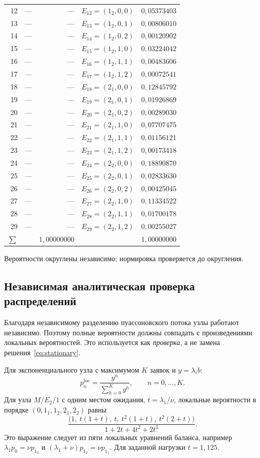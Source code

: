 \documentclass[a4paper,12pt]{article}
\begin{document}
{\begin{longtable}{@{}r l r l r@{}}
12 & --- & --- & $E_{12}=(1_{2},0,0)$ & $0{,}05373403$ \\
13 & --- & --- & $E_{13}=(1_{2},0,1)$ & $0{,}00806010$ \\
14 & --- & --- & $E_{14}=(1_{2},0,2)$ & $0{,}00120902$ \\
15 & --- & --- & $E_{15}=(1_{2},1,0)$ & $0{,}03224042$ \\
16 & --- & --- & $E_{16}=(1_{2},1,1)$ & $0{,}00483606$ \\
17 & --- & --- & $E_{17}=(1_{2},1,2)$ & $0{,}00072541$ \\
18 & --- & --- & $E_{18}=(2_{1},0,0)$ & $0{,}12845792$ \\
19 & --- & --- & $E_{19}=(2_{1},0,1)$ & $0{,}01926869$ \\
20 & --- & --- & $E_{20}=(2_{1},0,2)$ & $0{,}00289030$ \\
21 & --- & --- & $E_{21}=(2_{1},1,0)$ & $0{,}07707475$ \\
22 & --- & --- & $E_{22}=(2_{1},1,1)$ & $0{,}01156121$ \\
23 & --- & --- & $E_{23}=(2_{1},1,2)$ & $0{,}00173418$ \\
24 & --- & --- & $E_{24}=(2_{2},0,0)$ & $0{,}18890870$ \\
25 & --- & --- & $E_{25}=(2_{2},0,1)$ & $0{,}02833630$ \\
26 & --- & --- & $E_{26}=(2_{2},0,2)$ & $0{,}00425045$ \\
27 & --- & --- & $E_{27}=(2_{2},1,0)$ & $0{,}11334522$ \\
28 & --- & --- & $E_{28}=(2_{2},1,1)$ & $0{,}01700178$ \\
29 & --- & --- & $E_{29}=(2_{2},1,2)$ & $0{,}00255027$ \\
\midrule
$\sum$ & & $1{,}00000000$ & & $1{,}00000000$\\
\end{longtable}}
Вероятности округлены независимо; нормировка проверяется до округления.

\subsection{Независимая аналитическая проверка распределений}
Благодаря независимому разделению пуассоновского потока узлы работают независимо. Поэтому полные вероятности должны совпадать с произведениями локальных вероятностей. Это используется как \emph{проверка}, а не замена решения~\eqref{eq:stationary}.

Для экспоненциального узла с максимумом $K$ заявок и $y=\lambda_i b$:
\[
p_n^{\mathrm{loc}}=\frac{y^n}{\sum_{h=0}^{K}y^h},\qquad n=0,\ldots,K.
\]
Для узла $M/E_2/1$ с одним местом ожидания, $t=\lambda_1/\nu$, локальные вероятности в порядке $(0,1_1,1_2,2_1,2_2)$ равны
\[
\frac{\bigl(1,\ t(1+t),\ t,\ t^2(1+t),\ t^2(2+t)\bigr)}{1+2t+4t^2+2t^3}.
\]
Это выражение следует из пяти локальных уравнений баланса, например $\lambda_1p_0=\nu p_{1_2}$ и $(\lambda_1+\nu)p_{1_2}=\nu p_{1_1}$. Для заданной нагрузки $t=1{,}125$.
\end{document}
